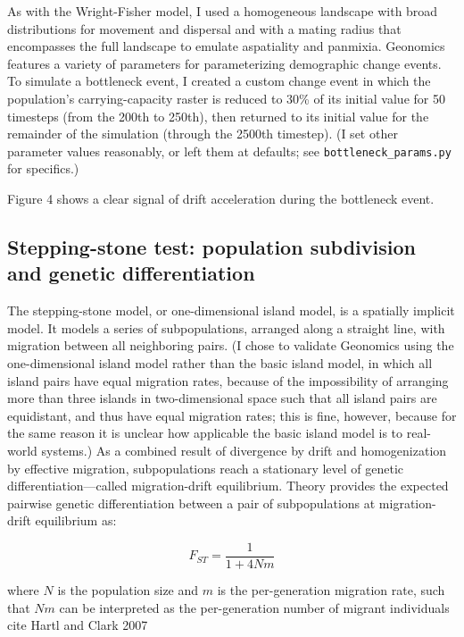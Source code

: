 ﻿\documentclass{article}
\begin{document}
As with the Wright-Fisher model, I used a homogeneous landscape with broad distributions
for movement and dispersal and with a mating radius that encompasses the full landscape
to emulate aspatiality and panmixia. Geonomics features a variety of parameters for
parameterizing demographic change events. To simulate a bottleneck event,
I created a custom change event in which the population's carrying-capacity raster
is reduced to 30\% of its initial value for 50 timesteps (from the 200th to 250th),
then returned to its initial value for the remainder of the simulation
(through the 2500th timestep).
(I set other parameter values reasonably, or left them at defaults;
see \texttt{bottleneck\_params.py} for specifics.)


Figure 4 shows a clear signal of drift acceleration during the bottleneck event.

\subsection{Stepping-stone test: population subdivision and genetic differentiation}
The stepping-stone model, or one-dimensional island model, is a spatially implicit model.
It models a series of subpopulations, arranged along a straight line,
with migration between all neighboring pairs. (I chose to validate Geonomics using
the one-dimensional island model rather than the basic island model, in which all
island pairs have equal migration rates, because of the impossibility of arranging
more than three islands in two-dimensional space such that all island pairs are
equidistant, and thus have equal migration rates; this is fine, however, because for
the same reason it is unclear how applicable the basic island model is to real-world
systems.) As a combined result of divergence by drift and homogenization
by effective migration, subpopulations reach a stationary level 
of genetic differentiation---called migration-drift equilibrium. 
Theory provides the expected pairwise genetic differentiation
between a pair of subpopulations at migration-drift equilibrium
as:

\begin{equation}
F_{ST} = \frac{1}{1 + 4Nm}
\end{equation}

where $N$ is the population size and $m$ is the per-generation migration rate,
such that $Nm$ can be interpreted as the per-generation number of migrant
individuals {\large cite  Hartl and Clark 2007}
\end{document}
